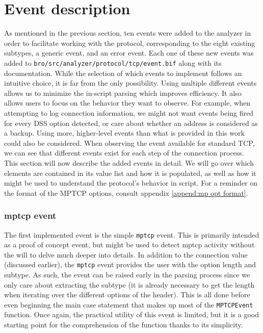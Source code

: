 \section{Event description}
As mentioned in the previous section, ten events were added to the analyzer in order to facilitate working with the protocol, corresponding to the eight existing subtypes, a generic event, and an error event. Each one of these new events was added to \texttt{bro/src/analyzer/protocol/tcp/event.bif} along with its documentation. While the selection of which events to implement follows an intuitive choice, it is far from the only possibility. Using multiple different events allows us to minimize the in-script parsing which improves efficiency. It also allows users to focus on the behavior they want to observe. For example, when attempting to log connection information, we might not want events being fired for every DSS option detected, or care about whether an address is considered as a backup. Using more, higher-level events than what is provided in this work could also be considered. When observing the event available for standard TCP, we can see that different events exist for each step of the connection process. \\

This section will now describe the added events in detail. We will go over which elements are contained in its value list and how it is populated, as well as how it might be used to understand the protocol's behavior in script. For a reminder on the format of the MPTCP options, consult appendix \ref{append:mp opt format}.

\subsubsection{mptcp event}
The first implemented event is the simple \texttt{mptcp} event. This is primarily intended as a proof of concept event, but might be used to detect mptcp activity without the will to delve much deeper into details. In addition to the connection value (discussed earlier), the \texttt{mptcp} event provides the user with the option length and subtype. As such, the event can be raised early in the parsing process since we only care about extracting the subtype (it is already necessary to get the length when iterating over the different options of the header). This is all done before even beginning the main case statement that makes up most of the \texttt{MPTCPEvent} function. Once again, the practical utility of this event is limited, but it is a good starting point for the comprehension of the function thanks to its simplicity. \\

